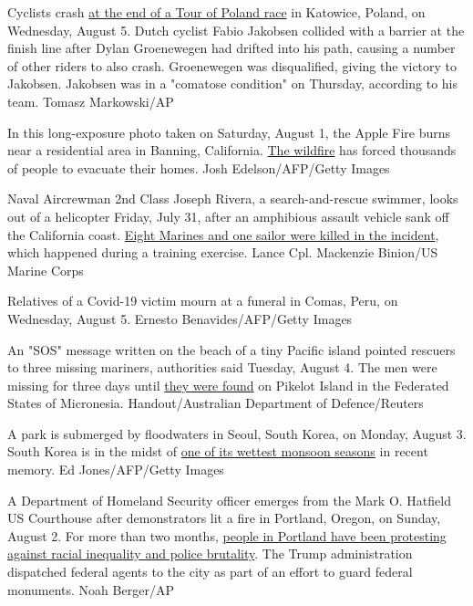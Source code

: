 Cyclists crash
\href{https://www.cnn.com/2020/08/06/sport/fabio-jakobsen-tour-of-poland-crash-cycling-spt-intl/index.html}{at
the end of a Tour of Poland race} in Katowice, Poland, on Wednesday,
August 5. Dutch cyclist Fabio Jakobsen collided with a barrier at the
finish line after Dylan Groenewegen had drifted into his path, causing a
number of other riders to also crash. Groenewegen was disqualified,
giving the victory to Jakobsen. Jakobsen was in a "comatose condition"
on Thursday, according to his team. Tomasz Markowski/AP

In this long-exposure photo taken on Saturday, August 1, the Apple Fire
burns near a residential area in Banning, California.
\href{https://www.cnn.com/2020/08/03/us/california-apple-fire-monday/index.html}{The
wildfire} has forced thousands of people to evacuate their homes. Josh
Edelson/AFP/Getty Images

Naval Aircrewman 2nd Class Joseph Rivera, a search-and-rescue swimmer,
looks out of a helicopter Friday, July 31, after an amphibious assault
vehicle sank off the California coast.
\href{https://www.cnn.com/2020/08/05/politics/amphibious-assault-vehicle-found-training/index.html}{Eight
Marines and one sailor were killed in the incident}, which happened
during a training exercise. Lance Cpl. Mackenzie Binion/US Marine Corps

Relatives of a Covid-19 victim mourn at a funeral in Comas, Peru, on
Wednesday, August 5. Ernesto Benavides/AFP/Getty Images

An "SOS" message written on the beach of a tiny Pacific island pointed
rescuers to three missing mariners, authorities said Tuesday, August 4.
The men were missing for three days until
\href{https://www.cnn.com/2020/08/03/asia/us-australian-micronesia-sos-pacific-island-rescue-intl-hnk-scli/index.html}{they
were found} on Pikelot Island in the Federated States of Micronesia.
Handout/Australian Department of Defence/Reuters

A park is submerged by floodwaters in Seoul, South Korea, on Monday,
August 3. South Korea is in the midst of
\href{https://www.cnn.com/2020/08/06/weather/south-korea-weather-heavy-rain-flood/index.html}{one
of its wettest monsoon seasons} in recent memory. Ed Jones/AFP/Getty
Images

A Department of Homeland Security officer emerges from the Mark O.
Hatfield US Courthouse after demonstrators lit a fire in Portland,
Oregon, on Sunday, August 2. For more than two months,
\href{https://www.cnn.com/2020/07/21/us/gallery/portland-protests/index.html}{people
in Portland have been protesting against racial inequality and police
brutality}. The Trump administration dispatched federal agents to the
city as part of an effort to guard federal monuments. Noah Berger/AP

